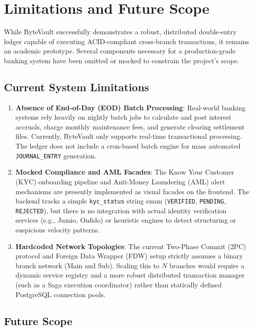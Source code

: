 \section{Limitations and Future Scope}

While ByteVault successfully demonstrates a robust, distributed double-entry ledger capable of executing ACID-compliant cross-branch transactions, it remains an academic prototype. Several components necessary for a production-grade banking system have been omitted or mocked to constrain the project's scope. 

\subsection{Current System Limitations}

\begin{enumerate}
    \item \textbf{Absence of End-of-Day (EOD) Batch Processing}: 
    Real-world banking systems rely heavily on nightly batch jobs to calculate and post interest accruals, charge monthly maintenance fees, and generate clearing settlement files. Currently, ByteVault only supports real-time transactional processing. The ledger does not include a cron-based batch engine for mass automated \texttt{JOURNAL\_ENTRY} generation.
    
    \item \textbf{Mocked Compliance and AML Facades}: 
    The Know Your Customer (KYC) onboarding pipeline and Anti-Money Laundering (AML) alert mechanisms are presently implemented as visual facades on the frontend. The backend tracks a simple \texttt{kyc\_status} string enum (\texttt{VERIFIED}, \texttt{PENDING}, \texttt{REJECTED}), but there is no integration with actual identity verification services (e.g., Jumio, Onfido) or heuristic engines to detect structuring or suspicious velocity patterns.
    
    \item \textbf{Hardcoded Network Topologies}: 
    The current Two-Phase Commit (2PC) protocol and Foreign Data Wrapper (FDW) setup strictly assumes a binary branch network (Main and Sub). Scaling this to $N$ branches would require a dynamic service registry and a more robust distributed transaction manager (such as a Saga execution coordinator) rather than statically defined PostgreSQL connection pools.
\end{enumerate}

\subsection{Future Scope}

